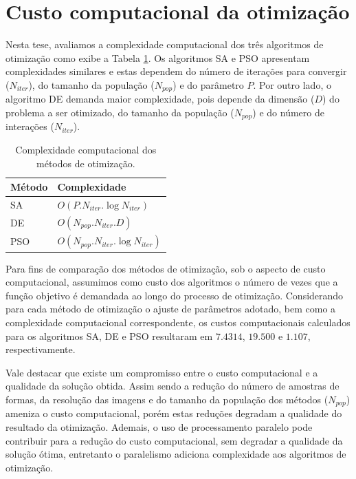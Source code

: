 \section{Custo computacional da otimização \label{sec:comp_cost}}


 Nesta tese,  avaliamos a complexidade computacional dos três algoritmos de otimização como exibe a Tabela \ref{tbl:complexity}.  Os algoritmos \ac{SA} e \ac{PSO} apresentam complexidades similares e estas dependem do número de iterações para convergir ($N_{iter}$), do tamanho da população  ($N_{pop}$) e do parâmetro $P$.  Por outro lado, o algoritmo \ac{DE} demanda maior complexidade, pois depende da dimensão ($D$) do problema a ser otimizado, do tamanho da população ($N_{pop}$) e do número de interações ($N_{iter}$).

\begin{table}[h!]
\centering
\caption{Complexidade computacional dos métodos de otimização.}
\label{tbl:complexity}
  \begin{tabular}{ll}
  \toprule[1.5pt]
 Método & Complexidade\\
 \midrule
   \ac{SA}  & $O(P.N_{iter}.\log{N_{iter}})$    \\
   \ac{DE}  & $O(N_{pop}.N_{iter}.D)$   \\
   \ac{PSO}&  $O(N_{pop}.N_{iter}.\log{N_{iter}})$\\
  \bottomrule[1.5pt]
  \end{tabular}
\end{table}

Para fins de comparação dos métodos de otimização, sob o aspecto de custo computacional, assumimos como custo dos algoritmos o número de vezes que a função objetivo é demandada ao longo do processo de otimização. Considerando para cada método de otimização o ajuste de parâmetros adotado, bem como a complexidade computacional correspondente, os custos computacionais calculados para os algoritmos \ac{SA}, \ac{DE} e \ac{PSO} resultaram em $7.4314$, $19.500$ e $1.107$, respectivamente. 

Vale destacar que existe um compromisso entre o custo computacional e a qualidade da solução obtida. Assim sendo a redução do número de amostras de formas, da resolução das imagens e do tamanho da população dos métodos ($N_{pop}$) ameniza o custo computacional, porém estas reduções degradam a qualidade do resultado da otimização. Ademais, o uso de processamento paralelo pode contribuir para a redução do custo computacional, sem degradar a qualidade da solução ótima, entretanto o paralelismo adiciona complexidade aos algoritmos de otimização. 



